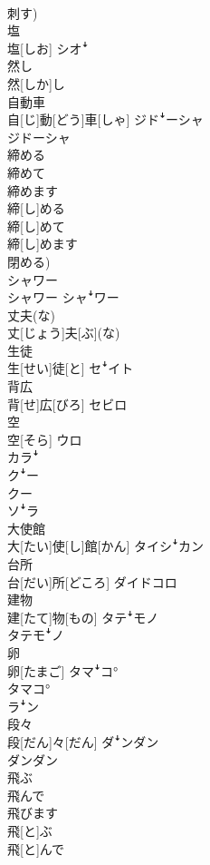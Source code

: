 \documentclass[8pt]{extreport}
\begin{document}
\begin{CJK}{UTF8}{min}
\\	刺す)	
\\	塩	
\\	塩[しお]	シオꜜ
\\	然し	
\\	然[しか]し	
\\	自動車	
\\	自[じ]動[どう]車[しゃ]	ジドꜜーシャ 
\\	ジドーシャ
\\	締める 
\\	締めて 
\\	締めます	
\\	締[し]める 
\\	締[し]めて 
\\	締[し]めます 
\\	閉める)	
\\	シャワー	
\\	シャワー	シャꜜワー
\\	丈夫(な)	
\\	丈[じょう]夫[ぶ](な)	
\\	生徒	
\\	生[せい]徒[と]	セꜜイト
\\	背広	
\\	背[せ]広[びろ]	セビロ
\\	空	
\\	空[そら]	ウロ 
\\	カラꜜ 
\\	クꜜー 
\\	クー 
\\	ソꜜラ
\\	大使館	
\\	大[たい]使[し]館[かん]	タイシꜜカン
\\	台所	
\\	台[だい]所[どころ]	ダイドコロ
\\	建物	
\\	建[たて]物[もの]	タテꜜモノ 
\\	タテモꜜノ
\\	卵	
\\	卵[たまご]	タマꜜコ° 
\\	タマコ° 
\\	ラꜜン
\\	段々	
\\	段[だん]々[だん]	ダꜜンダン 
\\	ダンダン
\\	飛ぶ 
\\	飛んで 
\\	飛びます	
\\	飛[と]ぶ 
\\	飛[と]んで 

\end{CJK}
\end{document}
